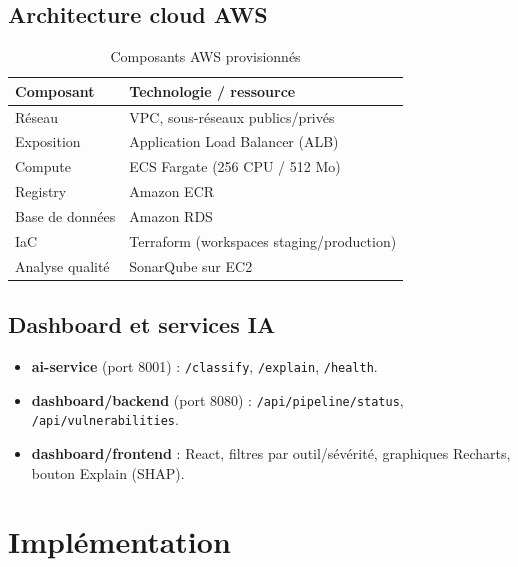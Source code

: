 \documentclass[12pt,a4paper]{report}
\begin{document}
\section{Architecture cloud AWS}
\begin{table}[H]
\centering
\begin{tabular}{@{}ll@{}}
\toprule
\textbf{Composant} & \textbf{Technologie / ressource} \\
\midrule
Réseau & VPC, sous-réseaux publics/privés \\
Exposition & Application Load Balancer (ALB) \\
Compute & ECS Fargate (256 CPU / 512 Mo) \\
Registry & Amazon ECR \\
Base de données & Amazon RDS \\
IaC & Terraform (workspaces staging/production) \\
Analyse qualité & SonarQube sur EC2 \\
\bottomrule
\end{tabular}
\caption{Composants AWS provisionnés}
\label{tab:aws}
\end{table}

\section{Dashboard et services IA}
\begin{itemize}
    \item \textbf{ai-service} (port 8001) : \texttt{/classify}, \texttt{/explain}, \texttt{/health}.
    \item \textbf{dashboard/backend} (port 8080) : \texttt{/api/pipeline/status}, \texttt{/api/vulnerabilities}.
    \item \textbf{dashboard/frontend} : React, filtres par outil/sévérité, graphiques Recharts, bouton Explain (SHAP).
\end{itemize}

\chapter{Implémentation}
\end{document}
